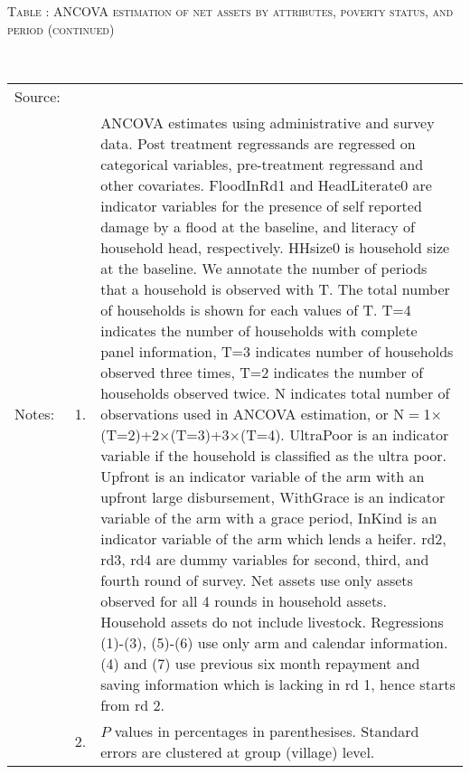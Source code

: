 \addtocounter{table}{-1}
\hspace{-1cm}\begin{minipage}[t]{14cm}
\hfil\textsc{\normalsize Table \thetable: ANCOVA estimation of net assets by attributes, poverty status, and period (continued)\label{tab NetAssetsTimeVaryingPovertyStatusAttributesANCOVA2}}\\
\setlength{\tabcolsep}{1pt}
\setlength{\baselineskip}{8pt}
\renewcommand{\arraystretch}{.55}
\hfil{}\\
\renewcommand{\arraystretch}{.8}
\setlength{\tabcolsep}{1pt}
\begin{tabular}{>{\hfill\scriptsize}p{1cm}<{}>{\hfill\scriptsize}p{.25cm}<{}>{\scriptsize}p{12cm}<{\hfill}}
Source:& \multicolumn{2}{l}{\scriptsize Estimated with GUK administrative and survey data.}\\
Notes: & 1. & ANCOVA estimates using administrative and survey data. Post treatment regressands are regressed on categorical variables, pre-treatment regressand and other covariates. \textsf{FloodInRd1} and \textsf{HeadLiterate0} are indicator variables for the presence of self reported damage by a flood at the baseline, and literacy of household head, respectively. \textsf{HHsize0} is household size at the baseline. We annotate the number of periods that a household is observed with \textsf{T}. The total number of households is shown for each values of \textsf{T}. \textsf{T=4} indicates the number of households with complete panel information, \textsf{T=3} indicates number of households observed three times, \textsf{T=2} indicates the number of households observed twice. \textsf{N} indicates total number of observations used in ANCOVA estimation, or \textsf{N$=$1$\times$(T=2)+2$\times$(T=3)+3$\times$(T=4)}.  \textsf{UltraPoor} is an indicator variable if the household is classified as the ultra poor. \textsf{Upfront} is an indicator variable of the arm with an upfront large disbursement, \textsf{WithGrace} is an indicator variable of the arm with a grace period, \textsf{InKind} is an indicator variable of the arm which lends a heifer. \textsf{rd2, rd3, rd4} are dummy variables for second, third, and fourth round of survey. Net assets use only assets observed for all 4 rounds in household assets. Household assets do not include livestock. Regressions (1)-(3), (5)-(6) use only arm and calendar information. (4) and (7) use previous six month repayment and saving information which is lacking in rd 1, hence starts from rd 2.\\
& 2. & $P$ values in percentages in parenthesises. Standard errors are clustered at group (village) level.
\end{tabular}
\end{minipage}

